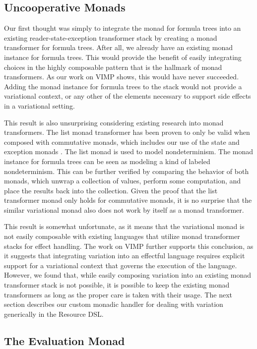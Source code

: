 \documentclass[12pt,oneside]{book}
\begin{document}
\subsection{Uncooperative Monads}

Our first thought was simply to integrate the monad for formula trees into an existing reader-state-exception transformer stack by
creating a monad transformer for formula trees.
After all, we already have an existing monad instance for formula trees. This would provide the benefit of easily integrating choices in the highly
composable pattern that is the hallmark of monad transformers. As our work on VIMP shows, this would have never succeeded.
Adding the monad instance for formula trees to the stack would not provide a variational context, or any other of the elements
necessary to support side effects in a variational setting.

This result is also unsurprising considering existing research into monad transformers. The list monad transformer has been
proven to only be valid when composed with commutative monads, which includes our use of the state and exception monads \cite{jones1993composing}.
The list monad is used to model nondeterminism. The monad instance for formula trees can be seen as modeling a kind of labeled nondeterminism.
This can be further verified by comparing the behavior of both monads, which unwrap a collection of values, perform some computation, and
place the results back into the collection. Given the proof that the list transformer monad only holds for commutative monads, it is no
surprise that the similar variational monad also does not work by itself as a monad transformer.

This result is somewhat unfortunate, as it means that the variational monad is not easily composable with existing languages
that utilize monad transformer stacks for effect handling. The work on VIMP further supports this conclusion, as it suggests that
integrating variation into an effectful language requires explicit support for a variational context that governs the execution of the
language. However, we found that, while easily composing variation into an existing monad transformer stack is not possible, it
is possible to keep the existing monad transformers as long as the proper care is taken with their usage. The next section
describes our custom monadic handler for dealing with variation generically in the Resource DSL.

\subsection{The Evaluation Monad}
\label{sec:evalmonad}
\end{document}
